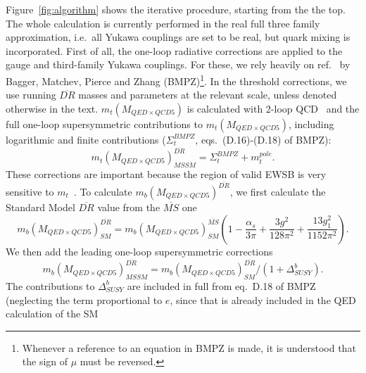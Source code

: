 \documentclass{article}
\begin{document}
Figure~\ref{fig:algorithm} shows the iterative procedure, starting from the the
top. The whole calculation is currently performed in the real full three family
approximation, i.e.\ all Yukawa couplings are set to be real, but quark mixing
is incorporated.
First of all, the one-loop radiative corrections are applied to the gauge
and third-family Yukawa couplings. For these, we rely heavily on
ref.~\cite{Pierce:1997zz}
by Bagger, Matchev, Pierce and Zhang (BMPZ)\footnote{Whenever a reference to
an equation in BMPZ is made, it is understood that the sign of $\mu$ must be
reversed.}.
In the threshold corrections, we use running $\overline{DR}$
masses and parameters at the relevant scale, unless denoted otherwise in the
text. 
$m_t(M_{QED \times QCD5})$ is calculated with 2-loop QCD~\cite{avdeev} and
the full one-loop supersymmetric
contributions to $m_t(M_{QED \times QCD5})$, including logarithmic and finite contributions
($\Sigma_t^{BMPZ}$, eqs.~(D.16)-(D.18) of BMPZ):
\begin{equation}
m_t(M_{QED \times QCD5})^{\overline{DR}}_{MSSM} = \Sigma_t^{BMPZ} + m_t^{pole}. 
\end{equation}
These corrections are important because the region of valid EWSB is very
sensitive to $m_t$~\cite{Allanach:2000ii}. 
To calculate $m_b(M_{QED \times QCD5})^{\overline{DR}}$, we first calculate the Standard Model
$\overline{DR}$ value from the $\overline{MS}$ one~\cite{avdeev,bottomMass}
\begin{equation}
m_b(M_{QED \times QCD5})^{\overline{DR}}_{SM} =
m_b(M_{QED \times QCD5})^{\overline{MS}}_{SM} \left(1 - \frac{{\alpha_s}}{3 \pi}+ 
\frac{3 g^2}{128 \pi^2} + \frac{13 g_1^2}{1152 \pi^2} \right).
\end{equation}
We then add the leading one-loop supersymmetric corrections
\begin{equation}
m_b(M_{QED \times QCD5})^{\overline{DR}}_{MSSM}=m_b(M_{QED \times QCD5})^{\overline{DR}}_{SM} / (1 +
  \Delta_{SUSY}^b).
\end{equation}
The contributions to $\Delta_{SUSY}^b$ are
included in full from eq.~D.18 of BMPZ (neglecting the term proportional to
$e$, since that is already included in the QED calculation of the SM 
\end{document}
